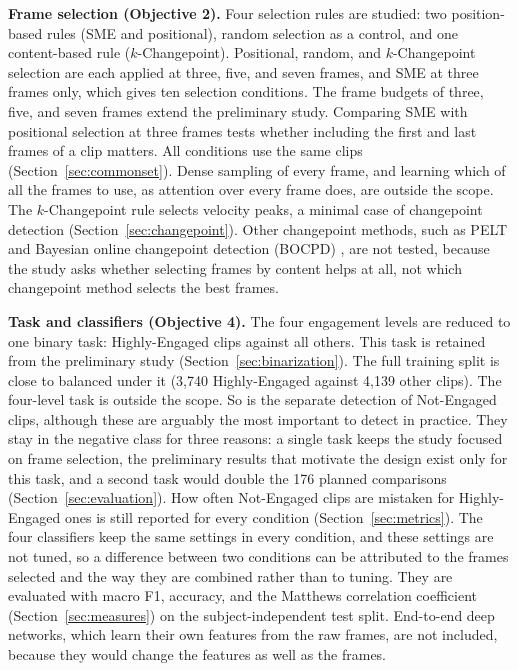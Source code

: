 \textbf{Frame selection (Objective 2).} Four selection rules are studied: two position-based rules (SME and positional), random selection as a control, and one content-based rule ($k$-Changepoint). Positional, random, and $k$-Changepoint selection are each applied at three, five, and seven frames, and SME at three frames only, which gives ten selection conditions. The frame budgets of three, five, and seven frames extend the preliminary study. Comparing SME with positional selection at three frames tests whether including the first and last frames of a clip matters. All conditions use the same clips (Section~\ref{sec:commonset}). Dense sampling of every frame, and learning which of all the frames to use, as attention over every frame does, are outside the scope. The $k$-Changepoint rule selects velocity peaks, a minimal case of changepoint detection (Section~\ref{sec:changepoint}). Other changepoint methods, such as PELT \cite{killick2012} and Bayesian online changepoint detection (BOCPD) \cite{adams2007}, are not tested, because the study asks whether selecting frames by content helps at all, not which changepoint method selects the best frames.

\textbf{Task and classifiers (Objective 4).} The four engagement levels are reduced to one binary task: Highly-Engaged clips against all others. This task is retained from the preliminary study (Section~\ref{sec:binarization}). The full training split is close to balanced under it (3,740 Highly-Engaged against 4,139 other clips). The four-level task is outside the scope. So is the separate detection of Not-Engaged clips, although these are arguably the most important to detect in practice. They stay in the negative class for three reasons: a single task keeps the study focused on frame selection, the preliminary results that motivate the design exist only for this task, and a second task would double the 176 planned comparisons (Section~\ref{sec:evaluation}). How often Not-Engaged clips are mistaken for Highly-Engaged ones is still reported for every condition (Section~\ref{sec:metrics}). The four classifiers keep the same settings in every condition, and these settings are not tuned, so a difference between two conditions can be attributed to the frames selected and the way they are combined rather than to tuning. They are evaluated with macro F1, accuracy, and the Matthews correlation coefficient (Section~\ref{sec:measures}) on the subject-independent test split. End-to-end deep networks, which learn their own features from the raw frames, are not included, because they would change the features as well as the frames.

